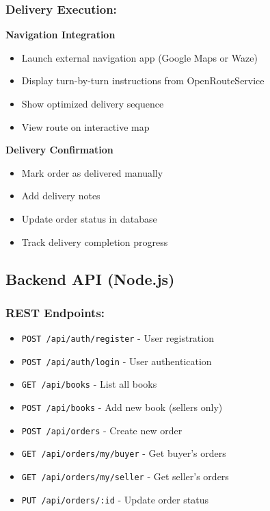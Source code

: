 \documentclass[12pt,a4paper]{article}
\begin{document}
\subsubsection{Delivery Execution:}

\textbf{Navigation Integration}
\begin{itemize}
    \item Launch external navigation app (Google Maps or Waze)
    \item Display turn-by-turn instructions from OpenRouteService
    \item Show optimized delivery sequence
    \item View route on interactive map
\end{itemize}

\textbf{Delivery Confirmation}
\begin{itemize}
    \item Mark order as delivered manually
    \item Add delivery notes
    \item Update order status in database
    \item Track delivery completion progress
\end{itemize}

\subsection{Backend API (Node.js)}

\subsubsection{REST Endpoints:}

\begin{itemize}
    \item \texttt{POST /api/auth/register} - User registration
    \item \texttt{POST /api/auth/login} - User authentication
    \item \texttt{GET /api/books} - List all books
    \item \texttt{POST /api/books} - Add new book (sellers only)
    \item \texttt{POST /api/orders} - Create new order
    \item \texttt{GET /api/orders/my/buyer} - Get buyer's orders
    \item \texttt{GET /api/orders/my/seller} - Get seller's orders
    \item \texttt{PUT /api/orders/:id} - Update order status
\end{itemize}
\end{document}
